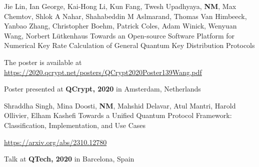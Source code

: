 \begin{cventries}
  \cventry
    {Jie Lin, Ian George, Kai-Hong Li, Kun Fang, Twesh Upadhyaya, \textbf{NM}, Max Chemtov, Shlok A Nahar, Shahabeddin M Aslmarand, Thomas Van Himbeeck, Yanbao Zhang, Christopher Boehm, Patrick Coles, Adam Winick, Wenyuan Wang, Norbert Lütkenhaus} %
    {Towards an Open-source Software Platform for Numerical Key Rate Calculation of General Quantum Key Distribution Protocols} %
    {} %
    {}
    {
      \begin{cvitems} %
        \item {The poster is available at \href{https://2020.qcrypt.net/posters/QCrypt2020Poster139Wang.pdf}{https://2020.qcrypt.net/posters/QCrypt2020Poster139Wang.pdf}}
        \item {Poster presented at \textbf{QCrypt, 2020} in Amsterdam, Netherlands}
      \end{cvitems}
    }

  \cventry
    {Shraddha Singh, Mina Doosti, \textbf{NM}, Mahshid Delavar, Atul Mantri, Harold Ollivier, Elham Kashefi} %
    {Towards a Unified Quantum Protocol Framework: Classification, Implementation, and Use Cases} %
    {} %
    {}
    {
      \begin{cvitems} %
        \item {\href{https://arxiv.org/abs/2310.12780}{https://arxiv.org/abs/2310.12780}}
        \item {Talk at \textbf{QTech, 2020} in Barcelona, Spain}
      \end{cvitems}
    }

\end{cventries}
